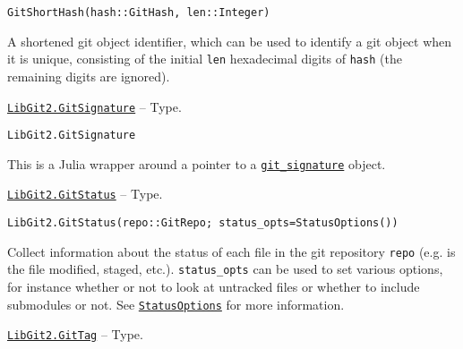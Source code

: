 \begin{adjustwidth}{2em}{0pt}


\begin{verbatim}
GitShortHash(hash::GitHash, len::Integer)
\end{verbatim}

A shortened git object identifier, which can be used to identify a git object when it is unique, consisting of the initial \texttt{len} hexadecimal digits of \texttt{hash} (the remaining digits are ignored).



\end{adjustwidth}
\hypertarget{16780673881553092129}{}
\hyperlink{16780673881553092129}{\texttt{LibGit2.GitSignature}}  -- {Type.}

\begin{adjustwidth}{2em}{0pt}


\begin{verbatim}
LibGit2.GitSignature
\end{verbatim}

This is a Julia wrapper around a pointer to a \href{https://libgit2.org/libgit2/\#HEAD/type/git\_signature}{\texttt{git\_signature}} object.



\end{adjustwidth}
\hypertarget{5023272497907128319}{}
\hyperlink{5023272497907128319}{\texttt{LibGit2.GitStatus}}  -- {Type.}

\begin{adjustwidth}{2em}{0pt}


\begin{verbatim}
LibGit2.GitStatus(repo::GitRepo; status_opts=StatusOptions())
\end{verbatim}

Collect information about the status of each file in the git repository \texttt{repo} (e.g. is the file modified, staged, etc.). \texttt{status\_opts} can be used to set various options, for instance whether or not to look at untracked files or whether to include submodules or not. See \hyperlink{15761804013497693135}{\texttt{StatusOptions}} for more information.



\end{adjustwidth}
\hypertarget{10467695058580020738}{}
\hyperlink{10467695058580020738}{\texttt{LibGit2.GitTag}}  -- {Type.}

